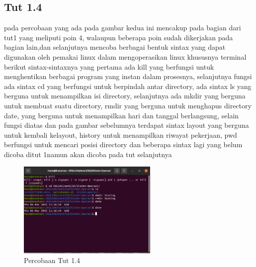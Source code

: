 \documentclass[11pt,a4paper]{article}
\begin{document}
\subsection{Tut 1.4}
pada percobaan yang ada pada gambar kedua ini mencakup pada bagian dari tut1 yang meliputi poin 4, walaupun beberapa poin sudah dikerjakan pada bagian lain,dan selanjutnya mencoba berbagai bentuk sintax yang dapat digunakan oleh pemakai linux dalam mengoperasikan linux khususnya terminal berikut sintax-sintaxnya yang pertama ada kill yang 
berfungsi untuk menghentikan berbagai program yang instan dalam prosesnya, selanjutnya fungsi ada sintax cd yang berfungsi untuk berpindah antar directory, ada sintax ls yang berguna untuk menampilkan isi directory, selanjutnya ada mkdir yang berguna untuk membuat suatu directory, rmdir yang berguna untuk menghapus directory date, yang berguna untuk menampilkan hari dan tanggal berlangsung, selain fungsi diatas dan pada gambar sebelumnya terdapat sintax layout yang berguna untuk kembali kelayout, history untuk menampilkan riwayat pekerjaan, pwd berfungsi untuk mencari posisi directory dan beberapa sintax lagi yang belum dicoba ditut 1namun akan dicoba pada tut selanjutnya
     \begin{figure}[h]
		\centering
		\includegraphics[width=0.6\textwidth]{Figure/tut1b.png}
		\caption{Percobaan Tut 1.4}
	\end{figure}
\end{document}
